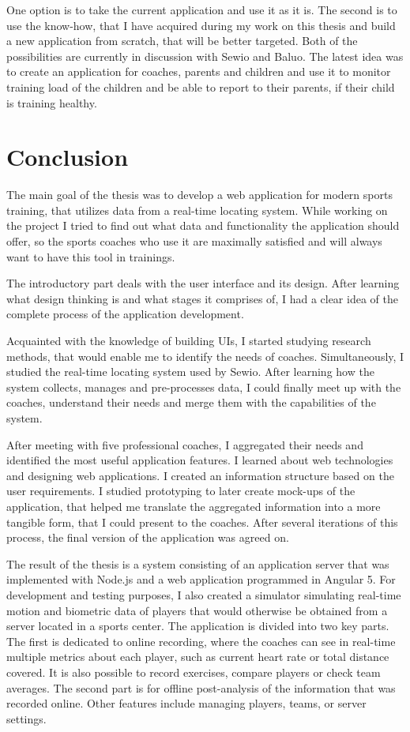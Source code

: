 One option is to take the current application and use it as it is. The second is to use the know-how, that I have acquired during my work on this thesis and build a new application from scratch, that will be better targeted. Both of the possibilities are currently in discussion with Sewio and Baluo. The latest idea was to create an application for coaches, parents and children and use it to monitor training load of the children and be able to report to their parents, if their child is training healthy.



\chapter{Conclusion}
The main goal of the thesis was to develop a web application for modern sports training, that utilizes data from a real-time locating system. While working on the project I tried to find out what data and functionality the application should offer, so the sports coaches who use it are maximally satisfied and will always want to have this tool in trainings.

The introductory part deals with the user interface and its design. After learning what design thinking is and what stages it comprises of, I had a clear idea of the complete process of the application development.

Acquainted with the knowledge of building UIs, I started studying research methods, that would enable me to identify the needs of coaches. Simultaneously, I studied the real-time locating system used by Sewio. After learning how the system collects, manages and pre-processes data, I could finally meet up with the coaches, understand their needs and merge them with the capabilities of the system.

After meeting with five professional coaches, I aggregated their needs and identified the most useful application features. I learned about web technologies and designing web applications. I created an information structure based on the user requirements. I studied prototyping to later create mock-ups of the application, that helped me translate the aggregated information into a more tangible form, that I could present to the coaches. After several iterations of this process, the final version of the application was agreed on.

The result of the thesis is a system consisting of an application server that was implemented with Node.js and a web application programmed in Angular 5. For development and testing purposes, I also created a simulator simulating real-time motion and biometric data of players that would otherwise be obtained from a server located in a sports center. The application is divided into two key parts. The first is dedicated to online recording, where the coaches can see in real-time multiple metrics about each player, such as current heart rate or total distance covered. It is also possible to record exercises, compare players or check team averages. The second part is for offline post-analysis of the information that was recorded online. Other features include managing players, teams, or server settings.

